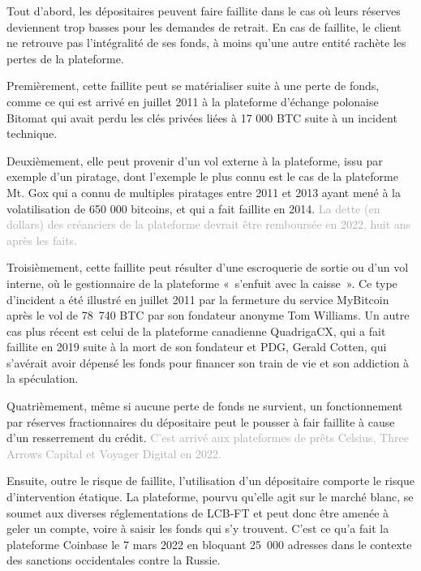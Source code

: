 Tout d'abord, les dépositaires peuvent faire faillite dans le cas où leurs réserves deviennent trop basses pour les demandes de retrait. En cas de faillite, le client ne retrouve pas l'intégralité de ses fonds, à moins qu'une autre entité rachète les pertes de la plateforme.

Premièrement, cette faillite peut se matérialiser suite à une perte de fonds, comme ce qui est arrivé en juillet 2011 à la plateforme d'échange polonaise Bitomat qui avait perdu les clés privées liées à 17 000 BTC suite à un incident technique.

Deuxièmement, elle peut provenir d'un vol externe à la plateforme, issu par exemple d'un piratage, dont l'exemple le plus connu est le cas de la plateforme Mt. Gox qui a connu de multiples piratages entre 2011 et 2013 ayant mené à la volatilisation de 650 000 bitcoins, et qui a fait faillite en 2014. \textcolor{darkgray}{La dette (en dollars) des créanciers de la plateforme devrait être remboursée en 2022, huit ans après les faits.}

Troisièmement, cette faillite peut résulter d'une escroquerie de sortie ou d'un vol interne, où le gestionnaire de la plateforme «~s'enfuit avec la caisse~». Ce type d'incident a été illustré en juillet 2011 par la fermeture du service MyBitcoin après le vol de 78~740 BTC par son fondateur anonyme Tom Williams. Un autre cas plus récent est celui de la plateforme canadienne QuadrigaCX, qui a fait faillite en 2019 suite à la mort de son fondateur et PDG, Gerald Cotten, qui s'avérait avoir dépensé les fonds pour financer son train de vie et son addiction à la spéculation.

Quatrièmement, même si aucune perte de fonds ne survient, un fonctionnement par réserves fractionnaires du dépositaire peut le pousser à fair faillite à cause d'un resserrement du crédit. \textcolor{darkgray}{C'est arrivé aux plateformes de prêts Celsius, Three Arrows Capital et Voyager Digital en 2022.}

Ensuite, outre le risque de faillite, l'utilisation d'un dépositaire comporte le risque d'intervention étatique. La plateforme, pourvu qu'elle agit sur le marché blanc, se soumet aux diverses réglementations de LCB-FT et peut donc être amenée à geler un compte, voire à saisir les fonds qui s'y trouvent. C'est ce qu'a fait la plateforme Coinbase le 7 mars 2022 en bloquant 25~000 adresses dans le contexte des sanctions occidentales contre la Russie.

